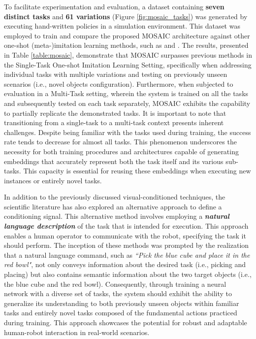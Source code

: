 To facilitate experimentation and evaluation, a dataset containing \textbf{seven distinct tasks} and \textbf{61 variations} (Figure \ref{fig:mosaic_tasks}) was generated by executing hand-written policies in a simulation environment. This dataset was employed to train and compare the proposed MOSAIC architecture against other one-shot (meta-)imitation learning methods, such as \cite{yu2018daml} and \cite{dasari2021transformers_one_shot}. The results, presented in Table \ref{table:mosaic}, demonstrate that MOSAIC surpasses previous methods in the Single-Task One-shot Imitation Learning Setting, specifically when addressing individual tasks with multiple variations and testing on previously unseen scenarios (i.e., novel objects configuration).
Furthermore, when subjected to evaluation in a Multi-Task setting, wherein the system is trained on all the tasks and subsequently tested on each task separately, MOSAIC exhibits the capability to partially replicate the demonstrated tasks. It is important to note that transitioning from a single-task to a multi-task context presents inherent challenges. Despite being familiar with the tasks used during training, the success rate tends to decrease for almost all tasks. This phenomenon underscores the necessity for both training procedures and architectures capable of generating embeddings that accurately represent both the task itself and its various sub-tasks. This capacity is essential for reusing these embeddings when executing new instances or entirely novel tasks.


In addition to the previously discussed visual-conditioned techniques, the scientific literature has also explored an alternative approach to define a conditioning signal. This alternative method involves employing a \textit{\textbf{natural language description}} of the task that is intended for execution. This approach enables a human operator to communicate with the robot, specifying the task it should perform. The inception of these methods was prompted by the realization that a natural language command, such as \textit{``Pick the blue cube and place it in the red bowl"}, not only conveys information about the desired task (i.e., picking and placing) but also contains semantic information about the two target objects (i.e., the blue cube and the red bowl). Consequently, through training a neural network with a diverse set of tasks, the system should exhibit the ability to generalize its understanding to both previously unseen objects within familiar tasks and entirely novel tasks composed of the fundamental actions practiced during training. This approach showcases the potential for robust and adaptable human-robot interaction in real-world scenarios.
